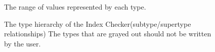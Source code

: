 \begin{figure}
\caption{The range of values represented by each type.}
\label{fig-index-figure}
\end{figure}

\begin{figure}
\caption{The type hierarchy of the Index Checker(subtype/supertype relationships) The types that are grayed out should not be written by the user.}
\label{fig-index-heirarchy}
\end{figure}